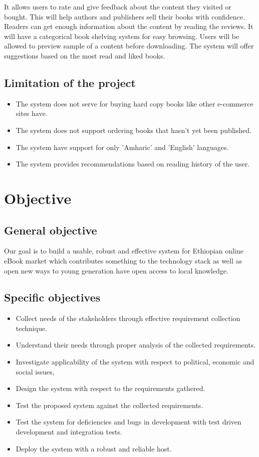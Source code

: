 It allows users to rate and give feedback about the content they visited or bought. This will help authors and publishers sell their books with confidence. Readers can get enough information about the content by reading the reviews. It will have a categorical book shelving system for easy browsing. Users will be allowed to preview sample of a content before downloading. The system will offer suggestions based on the most read and liked books.



	\subsection{Limitation of the project}

\begin{itemize}
\item The system does not serve for buying hard copy books like other e-commerce sites have.
\item The system does not support ordering books that hasn't yet been published.
\item The system have support for only 'Amharic' and 'English' languages.
\item The system provides recommendations based on reading history of the user.
\end{itemize}

	\section{Objective}
		\subsection{General objective}

Our goal is to build a usable, robust and effective system for Ethiopian online eBook market which contributes something to the technology stack as well as open new ways to young generation have open access to local knowledge.

		\subsection{Specific objectives}

\begin{itemize}
	\item Collect needs of the stakeholders through effective requirement collection technique.
	\item Understand their needs through proper analysis of the collected requirements.
   \item Investigate applicability of the system with respect to political, economic and social issues,
	\item Design the system with respect to the requirements gathered.
	\item Test the proposed system against the collected requirements.
   \item Test the system for deficiencies and bugs in development with test driven development and integration tests.
	\item Deploy the system with a robust and reliable host.	
\end{itemize}

